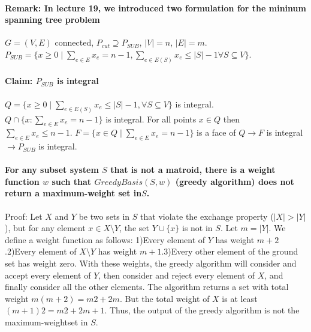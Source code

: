 \documentclass[main]{subfiles}
\begin{document}
\paragraph{Remark: In lecture 19, we introduced two formulation for the mininum
spanning tree problem}
$G=(V,E)$ connected, $P_{cut} \supseteq P_{SUB}$, $|V| = n$, $|E| = m$.
$P_{SUB} = \{x \geq 0 \mid \sum_{e \in E} x_e = n-1,
\sum_{e \in E(S)} x_e \leq |S| -1 \forall S \subseteq V\}$.

\paragraph{Claim: $P_{SUB}$ is integral}
$Q = \{x \geq 0 \mid \sum_{e \in E(S)} x_e \leq |S|-1, \forall S \subseteq V\}$
is integral. $Q \cap \{x: \sum_{e \in E} x_e = n-1\}$ is integral. For all
points $x \in Q$ then $\sum_{e \in E} x_e \leq n-1$.
$F = \{x \in Q \mid \sum_{e \in E} x_e = n-1\}$ is a face of $Q \rightarrow F$
is integral $\rightarrow P_{SUB}$ is integral.

\paragraph{For any subset system $S$ that is not a matroid, there is a weight
function $w$ such that $GreedyBasis(S,w)$ (greedy algorithm) does not return a
maximum-weight set in$S$.}
Proof: Let $X$ and $Y$ be two sets in $S$ that violate the exchange property
($|X|>|Y|$), but for any element $x\in X\setminus Y$, the set $Y \cup \{x\}$
is not in $S$. Let $m=|Y|$. We define a weight function as follows: 1)Every
element of $Y$ has weight $m+2$.2)Every element of $X\setminus Y$ has weight
$m+1$.3)Every other element of the ground set has weight zero. With these
weights, the greedy algorithm will consider and accept every element of $Y$,
then consider and reject every element of $X$, and finally consider all the
other elements. The algorithm returns a set with total weight $m(m+2)=m2+2m$.
But the total weight of $X$ is at least $(m+1)2=m2+2m+1$. Thus, the output of
the greedy algorithm is not the maximum-weightset in $S$.
\end{document}
